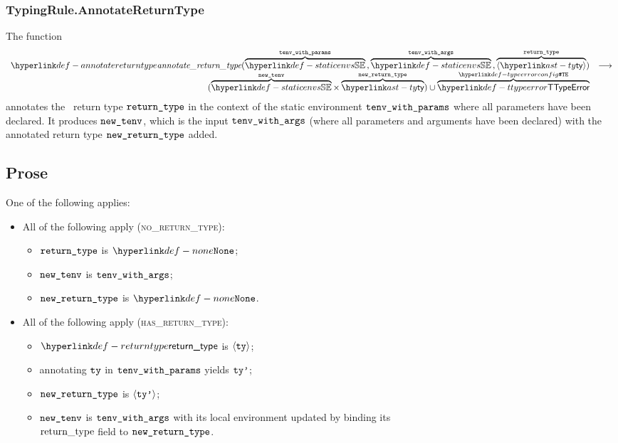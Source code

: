 \subsubsection{TypingRule.AnnotateReturnType \label{sec:TypingRule.AnnotateReturnType}}
\hypertarget{def-annotatereturntype}{}
The function
\[
\begin{array}{rl}
\annotatereturntype(
  \overname{\staticenvs}{\tenvwithparams} \aslsep
  \overname{\staticenvs}{\tenvwithargs} \aslsep
  \overname{\langle\ty\rangle}{\vreturntype}
) & \aslto \\
(\overname{\staticenvs}{\newtenv} \times \overname{\ty}{\newreturntype})
\cup \overname{\TTypeError}{\TypeErrorConfig} &
\end{array}
\]
annotates the \optional\ return type $\texttt{return\_type}$ in the context of the static environment
$\texttt{tenv\_with\_params}$ where all parameters have been declared.
It produces $\texttt{new\_tenv}$, which is the input $\texttt{tenv\_with\_args}$ (where all parameters and arguments have been declared) with the \optional{} annotated return type $\texttt{new\_return\_type}$ added.
\ProseOtherwiseTypeError

\subsection{Prose}
One of the following applies:
\begin{itemize}
  \item All of the following apply (\textsc{no\_return\_type}):
  \begin{itemize}
    \item $\texttt{return\_type}$ is $\None$;
    \item $\texttt{new\_tenv}$ is $\texttt{tenv\_with\_args}$;
    \item $\texttt{new\_return\_type}$ is $\None$.
  \end{itemize}

  \item All of the following apply (\textsc{has\_return\_type}):
  \begin{itemize}
    \item $\returntype$ is $\langle\texttt{ty}\rangle$;
    \item annotating $\texttt{ty}$ in $\texttt{tenv\_with\_params}$ yields $\texttt{ty'}$\ProseOrTypeError;
    \item $\texttt{new\_return\_type}$ is $\langle\texttt{ty'}\rangle$;
    \item $\texttt{new\_tenv}$ is $\texttt{tenv\_with\_args}$ with its local environment updated by binding its \\ $\text{return\_type}$ field
          to $\texttt{new\_return\_type}$.
  \end{itemize}
\end{itemize}

